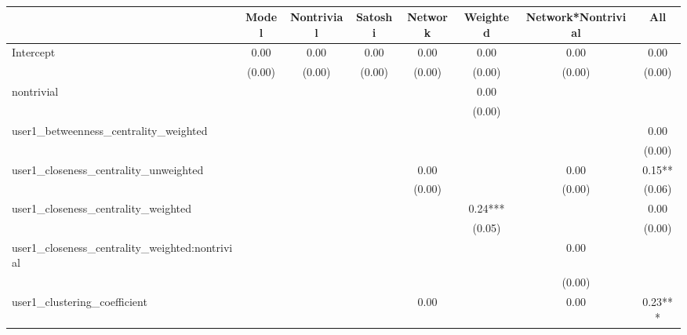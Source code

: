 \begin{table}
\caption{}
\begin{center}
\begin{tabular}{lccccccc}
\hline
                                               & Model    & Nontrivial & Satoshi & Network & Weighted & Network*Nontrivial &   All    \\
\hline
\hline

Intercept                                      & 0.00     & 0.00       & 0.00    & 0.00    & 0.00     & 0.00               & 0.00     \\
                                               & (0.00)   & (0.00)     & (0.00)  & (0.00)  & (0.00)   & (0.00)             & (0.00)   \\
nontrivial                                     &          &            &         &         & 0.00     &                    &          \\
                                               &          &            &         &         & (0.00)   &                    &          \\
user1_betweenness_centrality_weighted          &          &            &         &         &          &                    & 0.00     \\
                                               &          &            &         &         &          &                    & (0.00)   \\
user1_closeness_centrality_unweighted          &          &            &         & 0.00    &          & 0.00               & 0.15**   \\
                                               &          &            &         & (0.00)  &          & (0.00)             & (0.06)   \\
user1_closeness_centrality_weighted            &          &            &         &         & 0.24***  &                    & 0.00     \\
                                               &          &            &         &         & (0.05)   &                    & (0.00)   \\
user1_closeness_centrality_weighted:nontrivial &          &            &         &         &          & 0.00               &          \\
                                               &          &            &         &         &          & (0.00)             &          \\
user1_clustering_coefficient                   &          &            &         & 0.00    &          & 0.00               & 0.23***  \\

\end{tabular}
\end{center}
\end{table}
